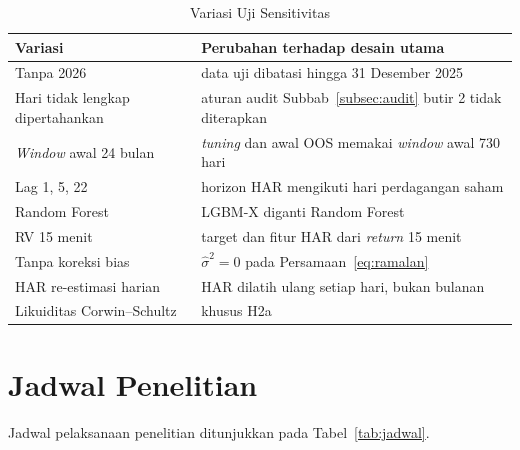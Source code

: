 \begin{table}[htbp]
  \caption{Variasi Uji Sensitivitas}
  \label{tab:sensitivitas}
  \centering
  \begingroup
  \small
  \begin{tabular}{|p{}|p{}|}
    \hline
    \textbf{Variasi} & \textbf{Perubahan terhadap desain utama} \\
    \hline
    Tanpa 2026 & data uji dibatasi hingga 31 Desember 2025 \\
    \hline
    Hari tidak lengkap dipertahankan & aturan audit
      Subbab~\ref{subsec:audit} butir 2 tidak diterapkan \\
    \hline
    \textit{Window} awal 24 bulan & \textit{tuning} dan awal OOS memakai
      \textit{window} awal 730 hari \\
    \hline
    Lag 1, 5, 22 & horizon HAR mengikuti hari perdagangan saham \\
    \hline
    Random Forest & LGBM-X diganti Random Forest \\
    \hline
    RV 15 menit & target dan fitur HAR dari \textit{return} 15 menit \\
    \hline
    Tanpa koreksi bias & $\hat\sigma^2 = 0$ pada
      Persamaan~\eqref{eq:ramalan} \\
    \hline
    HAR re-estimasi harian & HAR dilatih ulang setiap hari, bukan bulanan \\
    \hline
    Likuiditas Corwin--Schultz & khusus H2a \\
    \hline
  \end{tabular}
  \endgroup
\end{table}

\section{Jadwal Penelitian}
Jadwal pelaksanaan penelitian ditunjukkan pada Tabel~\ref{tab:jadwal}.

